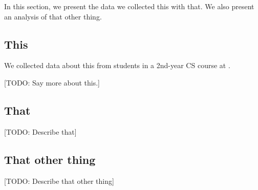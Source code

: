 In this section, we present the data we collected this with that.
We also present an analysis of that other thing.

\subsection{This}

We collected data about this from students in  a 2nd-year CS course at .

[TODO: Say more about this.]

\subsection{That}

[TODO: Describe that]

\subsection{That other thing}

[TODO: Describe that other thing]


